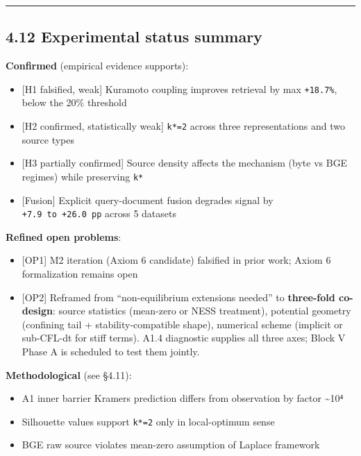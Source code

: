 \documentclass[
]{article}
\providecommand{\tightlist}{%
  \setlength{\itemsep}{0pt}\setlength{\parskip}{0pt}}
\begin{document}
\begin{center}\rule{0.5\linewidth}{0.5pt}\end{center}

\hypertarget{experimental-status-summary}{%
\subsection{4.12 Experimental status
summary}\label{experimental-status-summary}}

\textbf{Confirmed} (empirical evidence supports):

\begin{itemize}
\tightlist
\item
  {[}H1 falsified, weak{]} Kuramoto coupling improves retrieval by max
  \texttt{+18.7\%}, below the 20\% threshold
\item
  {[}H2 confirmed, statistically weak{]} \texttt{k*=2} across three
  representations and two source types
\item
  {[}H3 partially confirmed{]} Source density affects the mechanism
  (byte vs BGE regimes) while preserving \texttt{k*}
\item
  {[}Fusion{]} Explicit query-document fusion degrades signal by
  \texttt{+7.9\ to\ +26.0\ pp} across 5 datasets
\end{itemize}

\textbf{Refined open problems}:

\begin{itemize}
\tightlist
\item
  {[}OP1{]} M2 iteration (Axiom 6 candidate) falsified in prior work;
  Axiom 6 formalization remains open
\item
  {[}OP2{]} Reframed from ``non-equilibrium extensions needed'' to
  \textbf{three-fold co-design}: source statistics (mean-zero or NESS
  treatment), potential geometry (confining tail + stability-compatible
  shape), numerical scheme (implicit or sub-CFL-dt for stiff terms).
  A1.4 diagnostic supplies all three axes; Block V Phase A is scheduled
  to test them jointly.
\end{itemize}

\textbf{Methodological} (see §4.11):

\begin{itemize}
\tightlist
\item
  A1 inner barrier Kramers prediction differs from observation by factor
  \textasciitilde10⁴
\item
  Silhouette values support \texttt{k*=2} only in local-optimum sense
\item
  BGE raw source violates mean-zero assumption of Laplace framework
\end{itemize}
\end{document}
